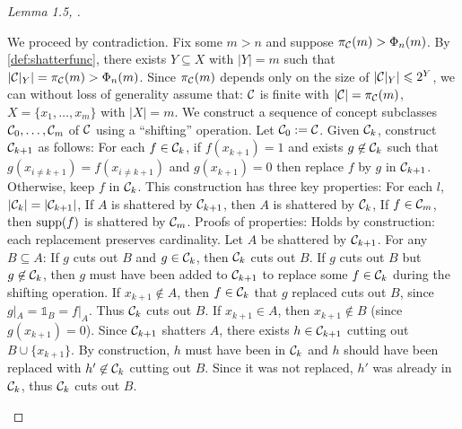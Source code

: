 \begin{proof}[Lemma 1.5, \cite{Chernikov}]
\begin{outline}
\0 We proceed by contradiction. Fix some $m>n$ and suppose $\pi_{\mathcal{C}}(m) > \Phi_n(m)$.
    \1 By \cref{def:shatterfunc}, there exists $Y\subseteq X$ with $|Y|=m$ such that $|\mathcal{C}|_Y| = \pi_{\mathcal{C}}(m) > \Phi_n(m)$. Since $\pi_{\mathcal{C}}(m)$ depends only on the size of $|\mathcal{C}|_Y|\leqslant 2^Y$, we can without loss of generality assume that: 
        \2 $\mathcal{C}$ is finite with $|\mathcal{C}| = \pi_{\mathcal{C}}(m)$,
        \2 $X=\{x_1,\ldots,x_m\}$ with $|X|=m$.
\0 We construct a sequence of concept subclasses $\mathcal{C}_0,\ldots,\mathcal{C}_m$ of $\mathcal{C}$ using a \enquote{shifting} operation. 
    \1 Let $\mathcal{C}_0 := \mathcal{C}$.
    \1 Given $\mathcal{C}_k$, construct $\mathcal{C}_{k+1}$ as follows: 
        \2 For each $f\in\mathcal{C}_k$, if $f(x_{k+1})=1$ and exists $g\not\in\mathcal{C}_k$ such that $g(x_{i\neq k+1})=f(x_{i\neq k+1})$ and $g(x_{k+1})=0$
        then replace $f$ by $g$ in $\mathcal{C}_{k+1}$. Otherwise, keep $f$ in $\mathcal{C}_k$.
    \1 This construction has three key properties:
        \2[(1)] For each $l$, $|\mathcal{C}_k|=|\mathcal{C}_{k+1}|$,
        \2[(2)] If $A$ is shattered by $\mathcal{C}_{k+1}$, then $A$ is shattered by $\mathcal{C}_k$,
        \2[(3)] If $f\in \mathcal{C}_m$, then $\operatorname{supp}(f)$ is shattered by $\mathcal{C}_m$.
    \1 Proofs of properties:
        \2[(1)] Holds by construction: each replacement preserves cardinality.
        \2[(2)] Let $A$ be shattered by $\mathcal{C}_{k+1}$. For any $B\subseteq A$:  
            \3 If $g$ cuts out $B$ and $g\in\mathcal{C}_k$, then $\mathcal{C}_k$ cuts out $B$.
            \3 If $g$ cuts out $B$ but $g\not\in\mathcal{C}_k$, then $g$ must have been added to $\mathcal{C}_{k+1}$ to replace some $f\in\mathcal{C}_k$ during the shifting operation. 
                \4 If $x_{k+1}\not\in A$, then $f\in\mathcal{C}_k$ that $g$ replaced cuts out $B$, since $g|_A=\mathds{1}_B=f|_A$. Thus $\mathcal{C}_k$ cuts out $B$.
                \4 If $x_{k+1}\in A$, then $x_{k+1} \not\in B$ (since $g(x_{k+1})=0$). Since $\mathcal{C}_{k+1}$ shatters $A$, there exists $h\in\mathcal{C}_{k+1}$ cutting out $B\cup \{x_{k+1}\}$. By construction, $h$ must have been in $\mathcal{C}_k$ and $h$ should have been replaced with $h'\not\in \mathcal{C}_k$ cutting out $B$. Since it was not replaced, $h'$ was already in $\mathcal{C}_k$, thus $\mathcal{C}_k$ cuts out $B$. 

\end{outline}
\end{proof}
